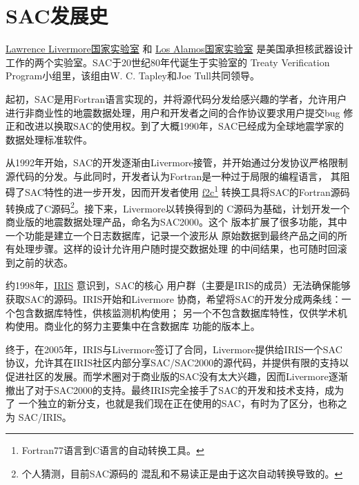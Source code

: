 \section{SAC发展史}
\label{sec:history}

\href{http://en.wikipedia.org/wiki/Lawrence\_Livermore\_National\_Laboratory}{Lawrence Livermore国家实验室}
和 \href{http://en.wikipedia.org/wiki/Los\_Alamos\_National\_Laboratory}{Los Alamos国家实验室}
是美国承担核武器设计工作的两个实验室。SAC于20世纪80年代诞生于实验室的
Treaty Verification Program小组里，该组由W. C. Tapley和Joe Tull共同领导。

起初，SAC是用Fortran语言实现的，并将源代码分发给感兴趣的学者，允许用户
进行非商业性的地震数据处理，用户和开发者之间的合作协议要求用户提交bug
修正和改进以换取SAC的使用权。到了大概1990年，SAC已经成为全球地震学家的
数据处理标准软件。

从1992年开始，SAC的开发逐渐由Livermore接管，并开始通过分发协议严格限制
源代码的分发。与此同时，开发者认为Fortran是一种过于局限的编程语言，
其阻碍了SAC特性的进一步开发，因而开发者使用
\href{http://www.netlib.org/f2c/}{f2c}\footnote{Fortran77语言到C语言的自动转换工具。}
转换工具将SAC的Fortran源码转换成了C源码\footnote{个人猜测，目前SAC源码的
混乱和不易读正是由于这次自动转换导致的。}。接下来，Livermore以转换得到的
C源码为基础，计划开发一个商业版的地震数据处理产品，命名为SAC2000。这个
版本扩展了很多功能，其中一个功能是建立一个日志数据库，记录一个波形从
原始数据到最终产品之间的所有处理步骤。这样的设计允许用户随时提交数据处理
的中间结果，也可随时回滚到之前的状态。

约1998年，\href{http://www.iris.edu}{IRIS} 意识到，SAC的核心
用户群（主要是IRIS的成员）无法确保能够获取SAC的源码。IRIS开始和Livermore
协商，希望将SAC的开发分成两条线：一个包含数据库特性，供核监测机构使用；
另一个不包含数据库特性，仅供学术机构使用。商业化的努力主要集中在含数据库
功能的版本上。

终于，在2005年，IRIS与Livermore签订了合同，Livermore提供给IRIS一个SAC
协议，允许其在IRIS社区内部分享SAC/SAC2000的源代码，并提供有限的支持以
促进社区的发展。而学术圈对于商业版的SAC没有太大兴趣，因而Livermore逐渐
撤出了对于SAC2000的支持。最终IRIS完全接手了SAC的开发和技术支持，成为了
一个独立的新分支，也就是我们现在正在使用的SAC，有时为了区分，也称之为
SAC/IRIS。
